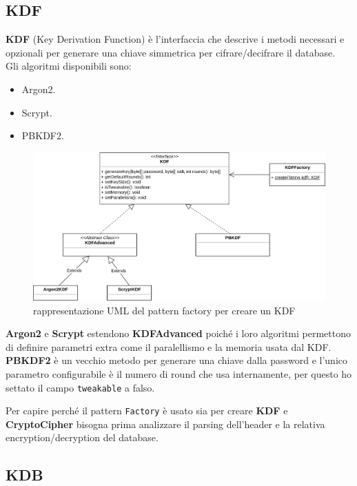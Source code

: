 \documentclass[a4paper,12pt]{report}
\begin{document}

\subsection*{KDF}

\textbf{KDF} (Key Derivation Function) è l'interfaccia che descrive i metodi necessari
e opzionali per generare una chiave simmetrica per cifrare/decifrare il database.\\
Gli algoritmi disponibili sono:
\begin{itemize}
  \item Argon2.
  \item Scrypt.
  \item PBKDF2.
\end{itemize}

\begin{figure}[h]
\centering{}
\includegraphics[width=\textwidth]{kdf}
\caption{rappresentazione UML del pattern factory per creare un KDF}
\end{figure}

\textbf{Argon2} e \textbf{Scrypt} estendono \textbf{KDFAdvanced} poiché i loro
algoritmi permettono di definire parametri extra come il paralellismo e la memoria usata
dal KDF. \textbf{PBKDF2} è un vecchio metodo per generare una chiave dalla password e
l'unico parametro configurabile è il numero di round che usa internamente, per questo
ho settato il campo \texttt{tweakable} a falso.

Per capire perché il pattern \texttt{Factory} è usato sia per creare \textbf{KDF}
e \textbf{CryptoCipher} bisogna prima analizzare il parsing dell'header e la relativa
encryption/decryption del database.

\subsection*{KDB}
\end{document}
